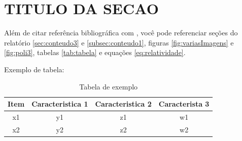 \section{TITULO DA SECAO}\label{sec:conteudo1}
Além de citar referência bibliográfica com \cite{exemploArtigo}, você pode referenciar seções do relatório \autoref{sec:conteudo3} e \autoref{subsec:conteudo1}, figuras \autoref{fig:variasImagens} e \autoref{fig:poli3}, tabelas \autoref{tab:tabela} e equações \autoref{eq:relatividade}.

Exemplo de tabela:
\begin{table}[h!]
    \centering
    \caption{Tabela de exemplo}
    \begin{tabular}{cccc}
        \toprule
        \textbf{Item} & \textbf{Caracteristica 1} & \textbf{Caracteristica 2} & \textbf{Caracterista 3}\\
        \midrule
        x1 & y1 & z1 & w1\\
        x2 & y2 & z2 & w2\\
        \bottomrule
    \end{tabular}
    \label{tab:tabela}
\end{table}

